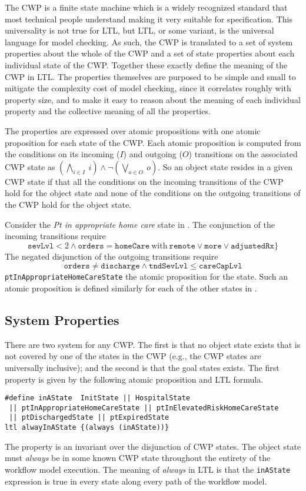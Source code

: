 The CWP is a finite state machine which is a widely recognized standard that most technical people understand making it very suitable for specification. This universality is not true for LTL, but LTL, or some variant, is the universal language for model checking. As such, the CWP is translated to a set of system properties about the whole of the CWP and a set of state properties about each individual state of the CWP. Together these exactly define the meaning of the CWP in LTL. The properties themselves are purposed to be simple and small to mitigate the complexity cost of model checking, since it correlates roughly with property size, and to make it easy to reason about the meaning of each individual property and the collective meaning of all the properties. 

The properties are expressed over atomic propositions with one atomic proposition for each state of the CWP. Each atomic proposition is computed from the conditions on its incoming ($I$) and outgoing ($O$) transitions on the associated CWP state as $(\bigwedge_{i \in I}\ i) \wedge \neg(\bigvee_{o \in O}\ o)$. So an object state resides in a given CWP state if that all the conditions on the incoming transitions of the CWP hold for the object state and none of the conditions on the outgoing transitions of the CWP hold for the object state.

Consider the \emph{Pt in appropriate home care} state in . The conjunction of the incoming transitions require
%
\[
  \mathtt{sevLvl} < 2 \wedge \mathtt{orders} = \mathtt{homeCare}\ \mathrm{with}\ \mathtt{remote} \vee \mathtt{more} \vee \mathtt{adjustedRx}\}
\]
%
The negated disjunction of the outgoing transitions require
%
\[
  \mathtt{orders} \neq \mathtt{discharge} \wedge \mathtt{tndSevLvl} \le \mathtt{careCapLvl}
\]
%
\noindent \texttt{ptInAppropriateHomeCareState} the atomic proposition for the state. Such an atomic proposition is defined similarly for each of the other states in .

\subsection{System Properties}
There are two system for any CWP. The first is that no object state exists that is not covered by one of the states in the CWP (e.g., the CWP states are universally inclusive); and the second is that the goal states exists. The first property is given by the following atomic proposition and LTL formula.
%
{\small
\begin{lstlisting}[style=myPromela]
#define inAState  InitState || HospitalState 
 || ptInAppropriateHomeCareState || ptInElevatedRiskHomeCareState
 || ptDischargedState || ptExpiredState
ltl alwayInAState {(always (inAState))}
\end{lstlisting}
}
%
\noindent The property is an invariant over the disjunction of CWP states. The object state must \emph{always} be in some known CWP state throughout the entirety of the workflow model execution. The meaning of \emph{always} in LTL is that the \texttt{inAState} expression is true in every state along every path of the workflow model.

